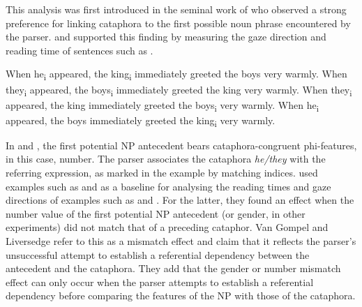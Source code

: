 \documentclass[output=paper,colorlinks,citecolor=brown]{langscibook}
\begin{document}
This analysis was first introduced in the seminal work of \citet{cowart1987} who observed a strong preference for linking cataphora to the first possible noun phrase encountered by the parser. \citet{sturt2003} and \citet{vanGompelLiversedge2003} supported this finding by measuring the gaze direction and reading time of sentences such as . 

\ea \label{ste-pav:ex:when-appeared} 
\ea When he\textsubscript{i} appeared, the king\textsubscript{i} immediately greeted the boys very warmly. \label{ste-pav:ex:when-appeared-a}
\ex When they\textsubscript{i} appeared, the boys\textsubscript{i} immediately greeted the king very warmly. \label{ste-pav:ex:when-appeared-b}
\ex When they\textsubscript{i} appeared, the king immediately greeted the boys\textsubscript{i} very warmly. \label{ste-pav:ex:when-appeared-c}
\ex When he\textsubscript{i} appeared, the boys immediately greeted the king\textsubscript{i} very warmly. \label{ste-pav:ex:when-appeared-d}
\z\z

\noindent In  and , the first potential NP antecedent bears cataphora-congruent phi-features, in this case, number. The parser associates the cataphora \textit{he/they} with the referring expression, as marked in the example by matching indices.  used examples such as  and  as a baseline for analysing the reading times and gaze directions of examples such as  and . For the latter, they found an effect when the number value of the first potential NP antecedent (or gender, in other experiments) did not match that of a preceding cataphor. Van Gompel and Liversedge refer to this as a mismatch effect and claim that it reflects the parser's unsuccessful attempt to establish a referential dependency between the antecedent and the cataphora. They add that the gender or number mismatch effect can only occur when the parser attempts to establish a referential dependency before comparing the features of the NP with those of the cataphora.
\end{document}

